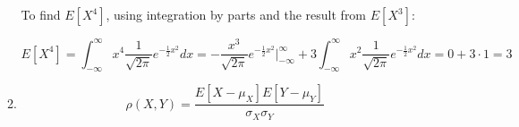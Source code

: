 \documentclass[11pt,letterpaper,titlepage]{article}
\begin{document}
\begin{enumerate}
\begin{enumerate}
        To find $ E[X^4] $, using integration by parts and the result from $ E[X^3] $:
        
        $$ E[X^4] = \int_{-\infty}^{\infty} x^4 \frac{1}{\sqrt{2\pi}} e^{-\frac{1}{2} x^2} dx = -\frac{x^3}{\sqrt{2\pi}} e^{-\frac{1}{2} x^2} \Big|_{-\infty}^{\infty} + 3 \int_{-\infty}^{\infty} x^2 \frac{1}{\sqrt{2\pi}} e^{-\frac{1}{2} x^2} dx = 0 + 3 \cdot 1 = 3 $$
        
        \item $$ \rho(X, Y) = \frac{E[X - \mu_{X}]E[Y - \mu_{Y}]}{\sigma_{X}\sigma_{Y}} $$
        
    \end{enumerate}
    
\end{enumerate}
\end{document}
